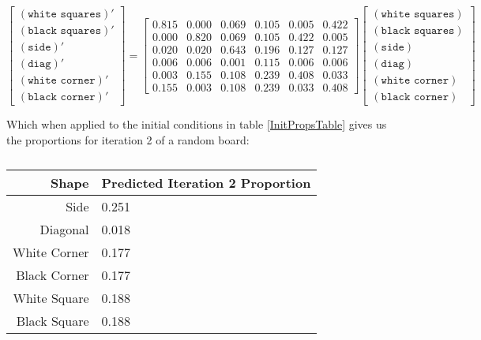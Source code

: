 \documentclass[12pt]{article}
\theoremstyle{definition}
\theoremstyle{remark}
\theoremstyle{remark}
\begin{document}
\begin{equation}
  \begin{bmatrix}
  (\texttt{white squares})' \\
  (\texttt{black squares})' \\
  (\texttt{side})' \\
  (\texttt{diag})' \\
  (\texttt{white corner})' \\
  (\texttt{black corner})'
  \end{bmatrix}
  =
  \begin{bmatrix}
  0.815 & 0.000 & 0.069 & 0.105 & 0.005 & 0.422 \\
  0.000 & 0.820 & 0.069 & 0.105 & 0.422 & 0.005 \\
  0.020 & 0.020 & 0.643 & 0.196 & 0.127 & 0.127 \\
  0.006 & 0.006 & 0.001 & 0.115 & 0.006 & 0.006 \\
  0.003 & 0.155 & 0.108 & 0.239 & 0.408 & 0.033 \\
  0.155 & 0.003 & 0.108 & 0.239 & 0.033 & 0.408 
  \end{bmatrix}
  \begin{bmatrix}
  (\texttt{white squares}) \\
  (\texttt{black squares}) \\
  (\texttt{side}) \\
  (\texttt{diag}) \\
  (\texttt{white corner}) \\
  (\texttt{black corner})
  \end{bmatrix}
\end{equation}

Which when applied to the initial conditions in table \ref{InitPropsTable} gives us the proportions for iteration 2 of a random board:
\begin{table}[H]
\label{SecondPropsTable}
\begin{tabular}{r | l}
  Shape & Predicted Iteration 2 Proportion \\ \hline
  Side & 0.251 \\
  Diagonal & 0.018 \\
  White Corner & 0.177 \\
  Black Corner & 0.177 \\
  White Square & 0.188 \\
  Black Square & 0.188 \\
\end{tabular}
\caption{}
\end{table}
\end{document}
